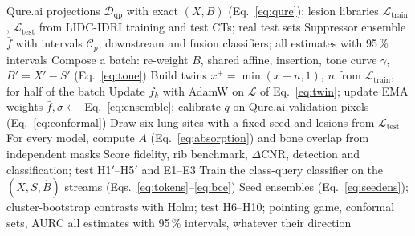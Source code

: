 \begin{algorithm}[!t]
\caption{Training, counterfactual audit and downstream evaluation}
\label{alg:pipeline}
\footnotesize
\begin{algorithmic}[1]
\REQUIRE Qure.ai projections $\mathcal{D}_{\mathrm{qp}}$ with exact $(X,B)$ (Eq.~\eqref{eq:qure}); lesion libraries
 $\mathcal{L}_{\mathrm{train}}$, $\mathcal{L}_{\mathrm{test}}$ from LIDC-IDRI training and test CTs; real test sets
\ENSURE Suppressor ensemble $\bar f$ with intervals $\mathcal{C}_p$; downstream and fusion classifiers; all estimates with 95\,\% intervals
  \STATE Compose a batch: re-weight $B$, shared affine, insertion, tone curve $\gamma$, $B'=X'-S'$ (Eq.~\eqref{eq:tone})
  \STATE Build twins $x^{+}=\min(x+n,1)$, $n$ from $\mathcal{L}_{\mathrm{train}}$, for half of the batch
  \STATE Update $f_k$ with AdamW on $\mathcal{L}$ of Eq.~\eqref{eq:twin}; update EMA weights
 \ENDFOR
\ENDFOR
\STATE $\bar f,\sigma\gets$ Eq.~\eqref{eq:ensemble}; calibrate $q$ on Qure.ai validation pixels (Eq.~\eqref{eq:conformal})
 \STATE Draw six lung sites with a fixed seed and lesions from $\mathcal{L}_{\mathrm{test}}$
 \STATE For every model, compute $A$ (Eq.~\eqref{eq:absorption}) and bone overlap from independent masks
\ENDFOR
\STATE Score fidelity, rib benchmark, $\Delta$CNR, detection and classification; test H1$'$--H5$'$ and E1--E3
 \STATE Train the class-query classifier on the $(X,S,\hat B)$ streams (Eqs.~\eqref{eq:tokens}--\eqref{eq:bce})
\ENDFOR
\STATE Seed ensembles (Eq.~\eqref{eq:seedens}); cluster-bootstrap contrasts with Holm; test H6--H10; pointing game, conformal sets, AURC
\RETURN all estimates with 95\,\% intervals, whatever their direction
\end{algorithmic}
\end{algorithm}
